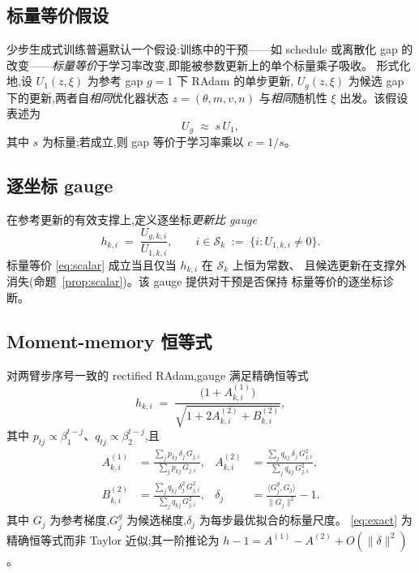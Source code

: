 \documentclass[UTF8,11pt,a4paper]{ctexart}
\begin{document}
\subsection{标量等价假设}
少步生成式训练普遍默认一个假设:训练中的干预——如 schedule 或离散化 gap 的
改变——\emph{标量等价}于学习率改变,即能被参数更新上的单个标量乘子吸收。
形式化地,设 $U_1(z,\xi)$ 为参考 gap $g=1$ 下 RAdam 的单步更新,
$U_g(z,\xi)$ 为候选 gap 下的更新,两者自\emph{相同}优化器状态
$z=(\theta,m,v,n)$ 与\emph{相同}随机性 $\xi$ 出发。该假设表述为
\begin{equation}
  U_g \;\approx\; s\, U_1,
  \label{eq:scalar}
\end{equation}
其中 $s$ 为标量;若成立,则 gap 等价于学习率乘以 $c=1/s$。

\subsection{逐坐标 gauge}
在参考更新的有效支撑上,定义逐坐标\emph{更新比 gauge}
\begin{equation}
  h_{k,i} \;=\; \frac{U_{g,k,i}}{U_{1,k,i}}, \qquad
  i \in \mathcal{S}_k \;:=\; \bigl\{ i : U_{1,k,i}\neq 0 \bigr\}.
  \label{eq:gauge}
\end{equation}
标量等价 \eqref{eq:scalar} 成立当且仅当 $h_{k,i}$ 在 $\mathcal{S}_k$ 上恒为常数、
且候选更新在支撑外消失(命题~\ref{prop:scalar})。该 gauge 提供对干预是否保持
标量等价的逐坐标诊断。

\subsection{Moment-memory 恒等式}
对两臂步序号一致的 rectified RAdam,gauge 满足精确恒等式
\begin{equation}
  h_{k,i} \;=\;
  \frac{\bigl(1 + A^{(1)}_{k,i}\bigr)}
       {\sqrt{1 + 2 A^{(2)}_{k,i} + B^{(2)}_{k,i}}},
  \label{eq:exact}
\end{equation}
其中 $p_{tj}\propto\beta_1^{t-j}$、$q_{tj}\propto\beta_2^{t-j}$,且
\begin{align}
  A^{(1)}_{k,i} &= \frac{\sum_j p_{kj}\,\delta_j\,G_{j,i}}
                        {\sum_j p_{kj}\,G_{j,i}},
  &
  A^{(2)}_{k,i} &= \frac{\sum_j q_{kj}\,\delta_j\,G_{j,i}^2}
                        {\sum_j q_{kj}\,G_{j,i}^2},\\[2pt]
  B^{(2)}_{k,i} &= \frac{\sum_j q_{kj}\,\delta_j^2\,G_{j,i}^2}
                        {\sum_j q_{kj}\,G_{j,i}^2},
  &
  \delta_j &= \frac{\langle G^g_j, G_j\rangle}{\lVert G_j\rVert^2} - 1.
  \label{eq:terms}
\end{align}
其中 $G_j$ 为参考梯度,$G^g_j$ 为候选梯度,$\delta_j$ 为每步最优拟合的标量尺度。
\eqref{eq:exact} 为精确恒等式而非 Taylor 近似;其一阶推论为
$h-1 = A^{(1)}-A^{(2)}+O(\lVert\delta\rVert^2)$。
\end{document}
